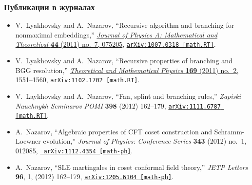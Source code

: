 \documentclass[pdftex]{beamer}
\theoremstyle{definition} \newtheorem{Def}{Определение}
\begin{document}
\begin{frame}
  \frametitle{Публикации в журналах}
  \begin{itemize}
  \item
    V.~{Lyakhovsky} and A.~{Nazarov}, ``{Recursive algorithm and branching for
      nonmaximal embeddings},''
    \href{http://dx.doi.org/10.1088/1751-8113/44/7/075205}{{\em Journal of
        Physics A: Mathematical and Theoretical} {\bf 44} (2011) no.~7, 075205},
    \href{http://arxiv.org/abs/1007.0318}{{\tt arXiv:1007.0318 [math.RT]}}.

  \item
    V.~{Lyakhovsky} and A.~{Nazarov}, ``{Recursive properties of branching and BGG
      resolution},'' \href{http://dx.doi.org/10.1007/s11232-011-0132-9}{{\em
        Theoretical and Mathematical Physics} {\bf 169} (2011) no.~2, 1551--1560},
    \href{http://arxiv.org/abs/1102.1702}{{\tt arXiv:1102.1702 [math.RT]}}.

  \item
    V.~{Laykhovsky} and A.~{Nazarov}, ``{Fan, splint and branching rules},'' {\em
      Zapiski Nauchnykh Seminarov POMI} {\bf 398} (2012)  162--179,
    \href{http://arxiv.org/abs/1111.6787}{{\tt arXiv:1111.6787 [math.RT]}}.

  \item
    A.~{Nazarov}, ``{Algebraic properties of CFT coset construction and
      Schramm-Loewner evolution},'' {\em Journal of Physics: Conference Series}
    {\bf 343} (2012) no.~1, 012085, \href{http://arxiv.org/abs/1112.4354}{{\tt
        arXiv:1112.4354 [math-ph]}}.
  \item
    A.~{Nazarov}, ``{SLE martingales in coset conformal field theory},''  {\em
      JETP Letters} {\bf 96}, 1,  (2012)  162--179,
    \href{http://arxiv.org/abs/1205.6104}{{\tt arXiv:1205.6104 [math-ph]}}.


  \end{itemize}
\end{frame}
\end{document}
